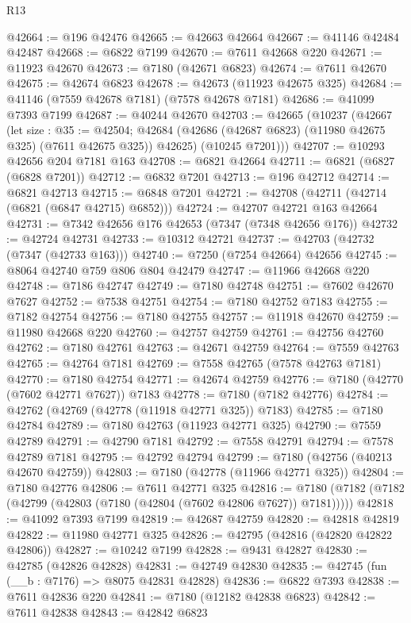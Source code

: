\begin{lexlean}{R13}
\begin{coremodule}
@42664 := @196 @42476
@42665 := @42663 @42664
@42667 := @41146 @42484 @42487
@42668 := @6822 @7199
@42670 := @7611 @42668 @220
@42671 := @11923 @42670
@42673 := @7180 (@42671 @6823)
@42674 := @7611 @42670
@42675 := @42674 @6823
@42678 := @42673 (@11923 @42675 @325)
@42684 := @41146 (@7559 @42678 @7181) (@7578 @42678 @7181)
@42686 := @41099 @7393 @7199
@42687 := @40244 @42670
@42703 := @42665
    (@10237
      (@42667
        (let size : @35 := @42504;
        @42684 (@42686 (@42687 @6823) (@11980 @42675 @325) (@7611 @42675 @325)) @42625)
        (@10245 @7201)))
@42707 := @10293 @42656 @204 @7181 @163
@42708 := @6821 @42664
@42711 := @6821 (@6827 (@6828 @7201))
@42712 := @6832 @7201
@42713 := @196 @42712
@42714 := @6821 @42713
@42715 := @6848 @7201
@42721 := @42708 (@42711 (@42714 (@6821 (@6847 @42715) @6852)))
@42724 := @42707 @42721 @163 @42664
@42731 := @7342 @42656 @176 @42653 (@7347 (@7348 @42656 @176))
@42732 := @42724 @42731
@42733 := @10312 @42721
@42737 := @42703 (@42732 (@7347 (@42733 @163)))
@42740 := @7250 (@7254 @42664) @42656
@42745 := @8064 @42740 @759 @806 @804 @42479
@42747 := @11966 @42668 @220
@42748 := @7186 @42747
@42749 := @7180 @42748
@42751 := @7602 @42670 @7627
@42752 := @7538 @42751
@42754 := @7180 @42752 @7183
@42755 := @7182 @42754
@42756 := @7180 @42755
@42757 := @11918 @42670
@42759 := @11980 @42668 @220
@42760 := @42757 @42759
@42761 := @42756 @42760
@42762 := @7180 @42761
@42763 := @42671 @42759
@42764 := @7559 @42763
@42765 := @42764 @7181
@42769 := @7558 @42765 (@7578 @42763 @7181)
@42770 := @7180 @42754
@42771 := @42674 @42759
@42776 := @7180 (@42770 (@7602 @42771 @7627)) @7183
@42778 := @7180 (@7182 @42776)
@42784 := @42762 (@42769 (@42778 (@11918 @42771 @325)) @7183)
@42785 := @7180 @42784
@42789 := @7180 @42763 (@11923 @42771 @325)
@42790 := @7559 @42789
@42791 := @42790 @7181
@42792 := @7558 @42791
@42794 := @7578 @42789 @7181
@42795 := @42792 @42794
@42799 := @7180 (@42756 (@40213 @42670 @42759))
@42803 := @7180 (@42778 (@11966 @42771 @325))
@42804 := @7180 @42776
@42806 := @7611 @42771 @325
@42816 := @7180 (@7182 (@7182 (@42799 (@42803 (@7180 (@42804 (@7602 @42806 @7627)) @7181)))))
@42818 := @41092 @7393 @7199
@42819 := @42687 @42759
@42820 := @42818 @42819
@42822 := @11980 @42771 @325
@42826 := @42795 (@42816 (@42820 @42822 @42806))
@42827 := @10242 @7199
@42828 := @9431 @42827
@42830 := @42785 (@42826 @42828)
@42831 := @42749 @42830
@42835 := @42745 (fun (__b : @7176) => @8075 @42831 @42828)
@42836 := @6822 @7393
@42838 := @7611 @42836 @220
@42841 := @7180 (@12182 @42838 @6823)
@42842 := @7611 @42838
@42843 := @42842 @6823

\end{coremodule}
\end{lexlean}
